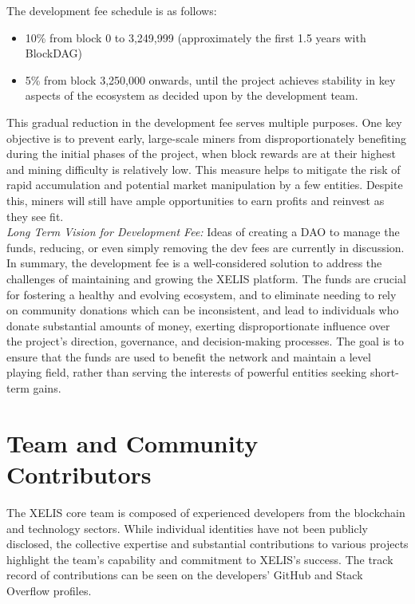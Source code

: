 \documentclass[10pt,a4paper,twocolumn]{article}
\begin{document}
The development fee schedule is as follows:

\begin{itemize}
    \item 10\% from block 0 to 3,249,999 (approximately the first 1.5 years with BlockDAG)
    \item 5\% from block 3,250,000 onwards, until the project achieves stability in key aspects of the ecosystem as decided upon by the development team. \end{itemize}
This gradual reduction in the development fee serves multiple purposes. One key objective is to prevent early, large-scale miners from disproportionately benefiting during the initial phases of the project, when block rewards are at their highest and mining difficulty is relatively low. This measure helps to mitigate the risk of rapid accumulation and potential market manipulation by a few entities. Despite this, miners will still have ample opportunities to earn profits and reinvest as they see fit.\\

\textit{Long Term Vision for Development Fee:} Ideas of creating a DAO to manage the funds, reducing, or even simply removing the dev fees are currently in discussion. \\

In summary, the development fee is a well-considered solution to address the challenges of maintaining and growing the XELIS platform. The funds are crucial for fostering a healthy and evolving ecosystem, and to eliminate needing to rely on community donations which can be inconsistent, and lead to individuals who donate substantial amounts of money, exerting disproportionate influence over the project's direction, governance, and decision-making processes. The goal is to ensure that the funds are used to benefit the network and maintain a level playing field, rather than serving the interests of powerful entities seeking short-term gains.


\section{Team and Community Contributors}

The XELIS core team is composed of experienced developers from the blockchain and technology sectors. While individual identities have not been publicly disclosed, the collective expertise and substantial contributions to various projects highlight the team's capability and commitment to XELIS's success. The track record of contributions can be seen on the developers' GitHub and Stack Overflow profiles.\\
\end{document}
